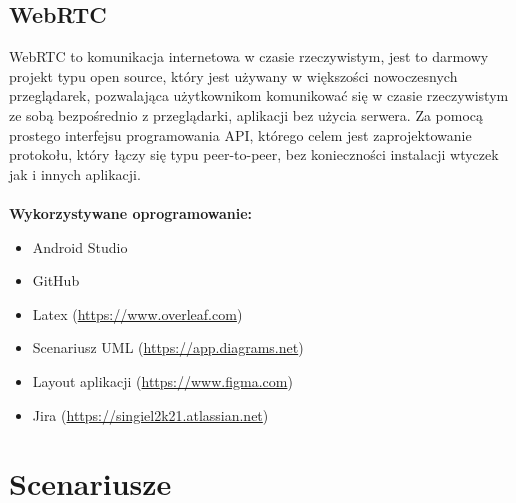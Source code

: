 \documentclass[12pt,a4paper]{article}
\begin{document}
\subsection*{\center\textbf{WebRTC}}
\hspace{10mm} WebRTC to komunikacja internetowa w czasie rzeczywistym\cite{webrtc}, jest to darmowy projekt typu open source, który jest używany w większości nowoczesnych przeglądarek, pozwalająca użytkownikom komunikować się w czasie rzeczywistym ze sobą bezpośrednio z przeglądarki, aplikacji bez użycia serwera. Za pomocą prostego interfejsu programowania API, którego celem jest zaprojektowanie protokołu, który łączy się typu peer-to-peer, bez konieczności instalacji wtyczek jak i innych aplikacji.\\
\\ 
\textbf{Wykorzystywane oprogramowanie:}
\begin{itemize} \itemsep-5pt
\item Android Studio
\item GitHub
\item Latex (\url{https://www.overleaf.com})
\item Scenariusz UML (\url{https://app.diagrams.net})
\item Layout aplikacji (\url{https://www.figma.com})
\item Jira (\url{https://singiel2k21.atlassian.net})
\end{itemize}

\newpage
\section{Scenariusze}
\end{document}
